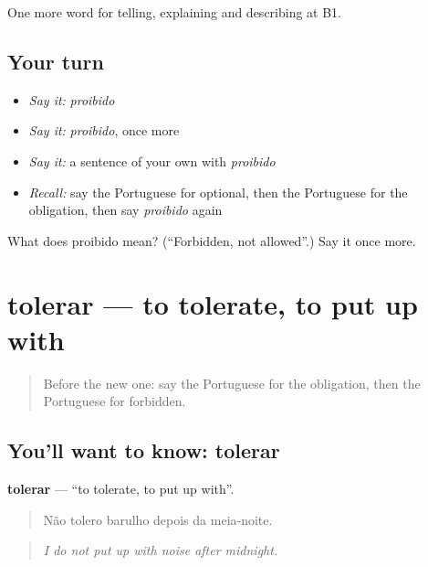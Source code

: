 \begin{grammarlens}[title={What you've built}]
One more word for telling, explaining and describing at B1.
\end{grammarlens}

\subsection*{Your turn}
\begin{itemize}
\raggedright
  \item \emph{Say it:} \emph{proibido}
  \item \emph{Say it:} \emph{proibido}, once more
  \item \emph{Say it:} a sentence of your own with \emph{proibido}
  \item \emph{Recall:} say the Portuguese for optional, then the Portuguese for the obligation, then say \emph{proibido} again
\end{itemize}

\begin{tcolorbox}[breakable,colback=teal!4,colframe=teal!35!black,title={Before you move on}]
What does proibido mean? (\textquotedblleft{}Forbidden, not allowed\textquotedblright{}.) Say it once more.
\end{tcolorbox}
\section[tolerar]{tolerar — to tolerate, to put up with}

\label{lesson:PT-C382-tolerar}



\begin{quote}
Before the new one: say the Portuguese for the obligation, then the Portuguese for forbidden.
\end{quote}

\subsection*{You'll want to know: tolerar}
\textbf{tolerar} — \textquotedblleft{}to tolerate, to put up with\textquotedblright{}.

\begin{quote}
Não tolero barulho depois da meia-noite.
\end{quote}

\begin{quote}
\emph{I do not put up with noise after midnight.}
\end{quote}


